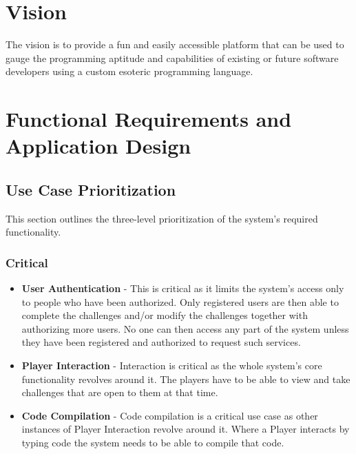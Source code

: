 \documentclass[english]{article}
\begin{document}
	\section{Vision}
	The vision is to provide a fun and easily accessible platform that can be used to gauge the programming aptitude and capabilities of existing or future software developers using a custom esoteric programming language.
	
	\newpage
	\section{Functional Requirements and Application Design}
	
		\subsection{Use Case Prioritization}
		This section outlines the three-level prioritization of the system's required functionality.
		\subsubsection{Critical}
		\begin{itemize}
	  		\item \textbf{User Authentication} - This is critical as it limits the system's access only to people who have been authorized. Only registered users are then able to 		complete the challenges and/or modify the challenges together with authorizing more users. No one can then access any part of the system unless they have been registered and authorized to request such services.
	  		
			\item \textbf{Player Interaction} -  Interaction is critical as the whole system's core functionality revolves around it. The players have to be able to view and take challenges that are open to them at that time.
			
			\item \textbf{Code Compilation} - Code compilation is a critical use case as other instances of Player Interaction revolve around it. Where a Player interacts by typing code the system needs to be able to compile that code.
	   \end{itemize} 
		
\end{document}

